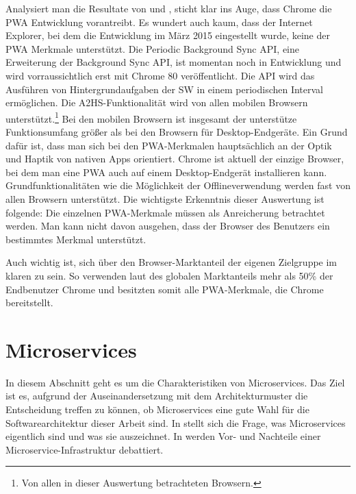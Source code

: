 Analysiert man die Resultate von  und
, sticht klar ins Auge, dass Chrome
die PWA Entwicklung vorantreibt. Es wundert auch kaum, dass der Internet Explorer,
bei dem die Entwicklung im März 2015 eingestellt wurde,\cite{HeiseInternetExplorer} keine der PWA Merkmale
unterstützt. Die Periodic Background Sync API, eine Erweiterung der Background
Sync API, ist momentan noch in Entwicklung und wird vorraussichtlich erst mit
Chrome 80 veröffentlicht. Die API wird das Ausführen von Hintergrundaufgaben der SW
in einem periodischen Interval ermöglichen.\cite{ChromeStatusPeriodicBackgroundSync}
Die A2HS-Funktionalität wird von allen mobilen Browsern unterstützt.\footnote{Von allen in dieser Auswertung betrachteten Browsern.}
Bei den mobilen Browsern ist insgesamt der unterstütze Funktionsumfang größer als
bei den Browsern für Desktop-Endgeräte. Ein Grund dafür ist, dass man sich bei den PWA-Merkmalen
hauptsächlich an der Optik und Haptik von nativen Apps orientiert. Chrome ist aktuell
der einzige Browser, bei dem man eine PWA auch auf einem Desktop-Endgerät installieren
kann. Grundfunktionalitäten wie  die Möglichkeit der Offlineverwendung werden fast von allen
Browsern unterstützt. Die wichtigste Erkenntnis dieser Auswertung ist folgende: Die einzelnen
PWA-Merkmale müssen als Anreicherung betrachtet werden. Man kann nicht davon ausgehen, dass
der Browser des Benutzers ein bestimmtes Merkmal unterstützt.

Auch wichtig ist, sich über den Browser-Marktanteil der eigenen Zielgruppe im klaren zu sein.
So verwenden laut des globalen Marktanteils mehr als 50\% der Endbenutzer Chrome und besitzten somit
alle PWA-Merkmale, die Chrome bereitstellt.\cite{StatCounterBrowserMarketShare}

\section{Microservices}
\label{sec:microservices}
In diesem Abschnitt geht es um die Charakteristiken von Microservices. Das Ziel ist es,
aufgrund der Auseinandersetzung mit dem Architekturmuster die Entscheidung treffen zu können, ob Microservices
eine gute Wahl für die Softwarearchitektur dieser Arbeit sind. In 
stellt sich die Frage, was Microservices eigentlich sind und was sie auszeichnet. In
 werden Vor- und Nachteile einer Microservice-Infrastruktur
debattiert.

